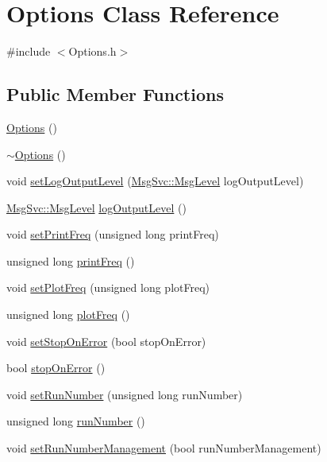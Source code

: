 \hypertarget{classOptions}{
\section{Options Class Reference}
\label{classOptions}
}


{\ttfamily \#include $<$Options.h$>$}\subsection*{Public Member Functions}
\begin{DoxyCompactItemize}
\item 
\hyperlink{classOptions_ab72fb640172a6109e34c8a5366563753}{Options} ()
\item 
\hyperlink{classOptions_a86ddb85b183f8b58af5481f30a42fa92}{$\sim$Options} ()
\item 
void \hyperlink{classOptions_a5d8ab053c941a944a53c0bfe871058a1}{setLogOutputLevel} (\hyperlink{classMsgSvc_ae671eb7301996cd049d2da8a65925926}{MsgSvc::MsgLevel} logOutputLevel)
\item 
\hyperlink{classMsgSvc_ae671eb7301996cd049d2da8a65925926}{MsgSvc::MsgLevel} \hyperlink{classOptions_a2d11716f34070dd7991648a26eb5d244}{logOutputLevel} ()
\item 
void \hyperlink{classOptions_adac15a8dbae0183ae7cecc09ebba6887}{setPrintFreq} (unsigned long printFreq)
\item 
unsigned long \hyperlink{classOptions_a67021ffef9f666bba4696f89807b2a70}{printFreq} ()
\item 
void \hyperlink{classOptions_a7df298047f1506fa2244cf096da96409}{setPlotFreq} (unsigned long plotFreq)
\item 
unsigned long \hyperlink{classOptions_a1e20abb20c1a2187f9455b39cd9d26ae}{plotFreq} ()
\item 
void \hyperlink{classOptions_a0d362af154c7d2e30a7bf340eb061fa5}{setStopOnError} (bool stopOnError)
\item 
bool \hyperlink{classOptions_afcd7b27fdf474050d912571e09525efe}{stopOnError} ()
\item 
void \hyperlink{classOptions_aed19a55eb2c418f333bc97615cf4a3a8}{setRunNumber} (unsigned long runNumber)
\item 
unsigned long \hyperlink{classOptions_a2d9447919fe90f9ce8df5530526cbb27}{runNumber} ()
\item 
void \hyperlink{classOptions_a7bf3fb2833021f8900eb105b0a9c02c5}{setRunNumberManagement} (bool runNumberManagement)
\item 

\end{DoxyCompactItemize}
